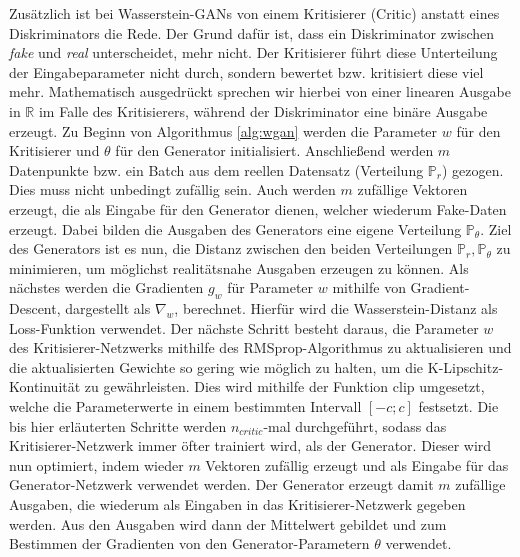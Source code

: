 \documentclass{hsflensburg}
\begin{document}
  Zusätzlich ist bei Wasserstein-GANs von einem Kritisierer (Critic) anstatt
  eines Diskriminators die Rede. Der Grund dafür ist, dass ein Diskriminator
  zwischen \textit{fake} und \textit{real} unterscheidet, mehr nicht. Der
  Kritisierer führt diese Unterteilung der Eingabeparameter nicht durch, sondern
  bewertet bzw. kritisiert diese viel mehr. Mathematisch ausgedrückt sprechen
  wir hierbei von einer linearen Ausgabe in $\mathbb{R}$ im Falle des
  Kritisierers, während der Diskriminator eine binäre Ausgabe erzeugt.  Zu
  Beginn von Algorithmus \ref{alg:wgan} werden die Parameter $w$ für den
  Kritisierer und $\theta$ für den Generator initialisiert. Anschließend werden
  $m$ Datenpunkte bzw. ein Batch aus dem reellen Datensatz (Verteilung
  $\mathbb{P}_r$) gezogen. Dies muss nicht unbedingt zufällig sein. Auch werden
  $m$ zufällige Vektoren erzeugt, die als Eingabe für den Generator dienen,
  welcher wiederum Fake-Daten erzeugt. Dabei bilden die Ausgaben des Generators
  eine eigene Verteilung $\mathbb{P}_\theta$.  Ziel des Generators ist es nun,
  die Distanz zwischen den beiden Verteilungen $\mathbb{P}_r, \mathbb{P}_\theta$
  zu minimieren, um möglichst realitätsnahe Ausgaben erzeugen zu können. Als
  nächstes werden die Gradienten $g_w$ für Parameter $w$ mithilfe von
  Gradient-Descent, dargestellt als $\nabla_w$, berechnet. Hierfür wird die
  Wasserstein-Distanz als Loss-Funktion verwendet.  Der nächste Schritt besteht
  daraus, die Parameter $w$ des Kritisierer-Netzwerks mithilfe des
  RMSprop-Algorithmus zu aktualisieren und die aktualisierten Gewichte so gering
  wie möglich zu halten, um die K-Lipschitz-Kontinuität zu gewährleisten. Dies
  wird mithilfe der Funktion $\mathrm{clip}$ umgesetzt, welche die
  Parameterwerte in einem bestimmten Intervall $\left[-c; c\right]$ festsetzt.
  Die bis hier erläuterten Schritte werden $n_{critic}$-mal durchgeführt, sodass
  das Kritisierer-Netzwerk immer öfter trainiert wird, als der Generator. Dieser
  wird nun optimiert, indem wieder $m$ Vektoren zufällig erzeugt und als Eingabe
  für das Generator-Netzwerk verwendet werden. Der Generator erzeugt damit $m$
  zufällige Ausgaben, die wiederum als Eingaben in das Kritisierer-Netzwerk
  gegeben werden. Aus den Ausgaben wird dann der Mittelwert gebildet und zum
  Bestimmen der Gradienten von den Generator-Parametern $\theta$ verwendet.
\end{document}
